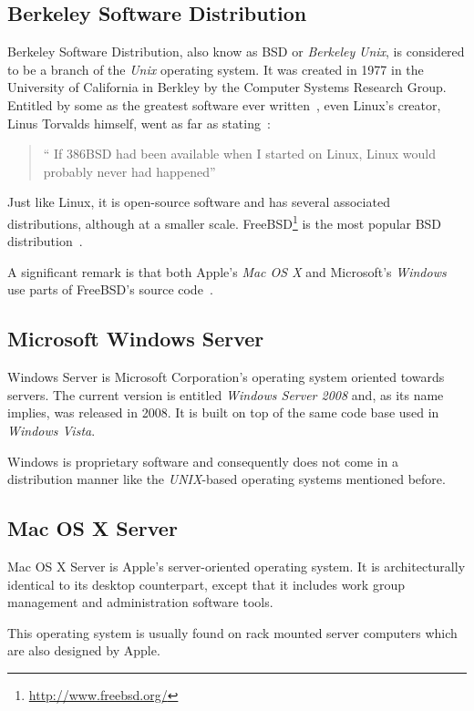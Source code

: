 \subsection{Berkeley Software Distribution}
Berkeley Software Distribution, also know as BSD or \textit{Berkeley} \textit{Unix}, is considered to be a branch of the \textit{Unix} operating system. It was created in 1977 in the University of California in Berkley by the Computer Systems Research Group.  Entitled by some as the greatest software ever written~\cite{ greatest_software_ever_written}, even Linux's creator, Linus Torvalds himself, went as far as stating~\cite{interview_linus}: 
\begin{quote}
  `` If 386BSD had been available when I started on Linux, Linux would probably never had happened''
\end{quote}
Just like Linux, it is open-source software and has several associated distributions, although at a smaller scale. FreeBSD\footnote{\url{http://www.freebsd.org/}} is the most popular BSD distribution~\cite{top_5_bsd_distros}.

A significant remark is that both Apple's \textit{Mac OS X} and Microsoft's \textit{Windows} use parts of FreeBSD's source code~\cite{leopard_os_foundations,bsd_code_windows}.

\subsection{Microsoft Windows Server}
Windows Server is Microsoft Corporation's operating system oriented towards servers. The current version is entitled \textit{Windows Server 2008} and, as its name implies, was released in 2008. It is built on top of the same code base used in \textit{Windows Vista}.

Windows is proprietary software and consequently does not come in a distribution manner like the \textit{UNIX}-based operating systems mentioned before.

\subsection{Mac OS X Server}
Mac OS X Server is Apple's server-oriented operating system. It is architecturally identical to its desktop counterpart, except that it includes work group management and administration software tools.

This operating system is usually found on rack mounted server computers which are also designed by Apple.
